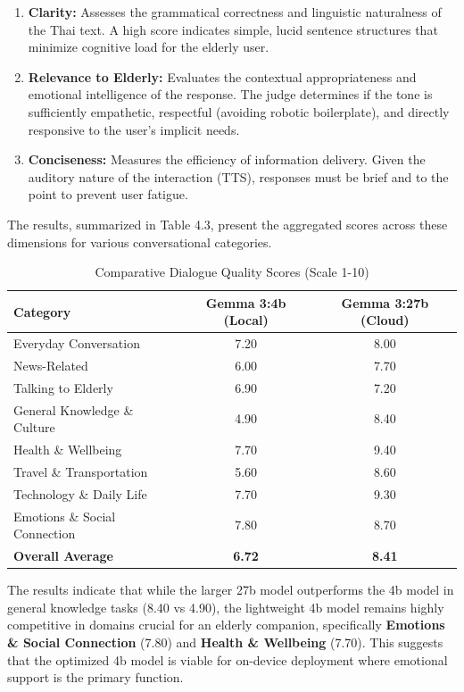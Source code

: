 \begin{enumerate}
    \item \textbf{Clarity:} Assesses the grammatical correctness and linguistic naturalness of the Thai text. A high score indicates simple, lucid sentence structures that minimize cognitive load for the elderly user.
    \item \textbf{Relevance to Elderly:} Evaluates the contextual appropriateness and emotional intelligence of the response. The judge determines if the tone is sufficiently empathetic, respectful (avoiding robotic boilerplate), and directly responsive to the user's implicit needs.
    \item \textbf{Conciseness:} Measures the efficiency of information delivery. Given the auditory nature of the interaction (TTS), responses must be brief and to the point to prevent user fatigue.
\end{enumerate}

\noindent\hspace{2.2em}The results, summarized in Table 4.3, present the aggregated scores across these dimensions for various conversational categories.

\begin{table}[hbt!]
    \centering
    \caption{Comparative Dialogue Quality Scores (Scale 1-10)}
    \label{tab:llm_eval_scores}
    \begin{tabular}{|l|c|c|}
    \hline
    \textbf{Category} & \textbf{Gemma 3:4b (Local)} & \textbf{Gemma 3:27b (Cloud)} \\ \hline
    Everyday Conversation & 7.20 & 8.00 \\ \hline
    News-Related & 6.00 & 7.70 \\ \hline
    Talking to Elderly & 6.90 & 7.20 \\ \hline
    General Knowledge \& Culture & 4.90 & 8.40 \\ \hline
    Health \& Wellbeing & 7.70 & 9.40 \\ \hline
    Travel \& Transportation & 5.60 & 8.60 \\ \hline
    Technology \& Daily Life & 7.70 & 9.30 \\ \hline
    Emotions \& Social Connection & 7.80 & 8.70 \\ \hline
    \textbf{Overall Average} & \textbf{6.72} & \textbf{8.41} \\ \hline
    \end{tabular}
\end{table}

\noindent\hspace{2.2em}The results indicate that while the larger 27b model outperforms the 4b model in general knowledge tasks (8.40 vs 4.90), the lightweight 4b model remains highly competitive in domains crucial for an elderly companion, specifically \textbf{Emotions \& Social Connection} (7.80) and \textbf{Health \& Wellbeing} (7.70). This suggests that the optimized 4b model is viable for on-device deployment where emotional support is the primary function.



